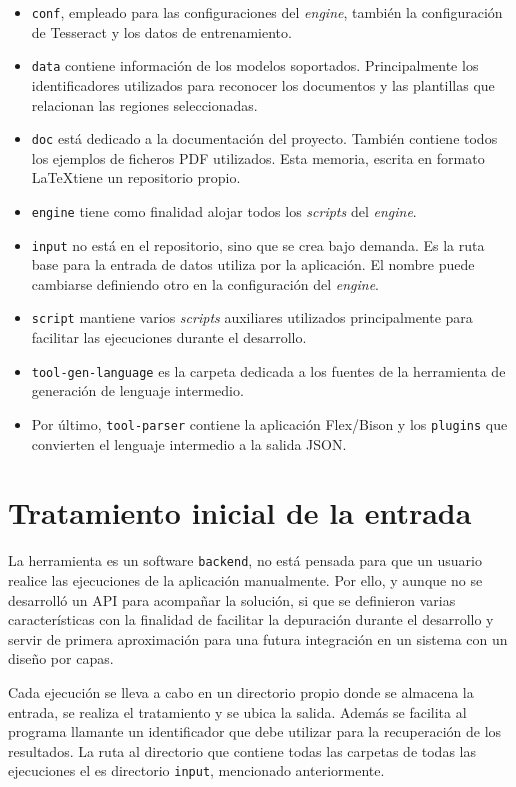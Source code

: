 \begin{itemize}
    \item \verb|conf|, empleado para las configuraciones del \emph{engine}, también la configuración de Tesseract y los datos de entrenamiento.
    \item \verb|data| contiene información de los modelos soportados. Principalmente los identificadores utilizados para reconocer los documentos y las plantillas que relacionan las regiones seleccionadas.
    \item \verb|doc| está dedicado a la documentación del proyecto. También contiene todos los ejemplos de ficheros PDF utilizados. Esta memoria, escrita en formato \LaTeX  tiene un repositorio propio.
    \item \verb|engine| tiene como finalidad alojar todos los \emph{scripts} del \emph{engine}.
    \item \verb|input| no está en el repositorio, sino que se crea bajo demanda. Es la ruta base para la entrada de datos utiliza por la aplicación. El nombre puede cambiarse definiendo otro en la configuración del \emph{engine}.
    \item \verb|script| mantiene varios \emph{scripts} auxiliares utilizados principalmente para facilitar las ejecuciones durante el desarrollo.
    \item \verb|tool-gen-language| es la carpeta dedicada a los fuentes de la herramienta de generación de lenguaje intermedio.
    \item Por último, \verb|tool-parser| contiene la aplicación Flex/Bison y los \verb|plugins| que convierten el lenguaje intermedio a la salida JSON.
\end{itemize}

\section{Tratamiento inicial de la entrada}

La herramienta es un software \verb|backend|, no está pensada para que un usuario realice las ejecuciones de la aplicación manualmente. Por ello, y aunque no se desarrolló un API para acompañar la solución, si que se definieron varias características con la finalidad de facilitar la depuración durante el desarrollo y servir de primera aproximación para una futura integración en un sistema con un diseño por capas.

Cada ejecución se lleva a cabo en un directorio propio donde se almacena la entrada, se realiza el tratamiento y se ubica la salida. Además se facilita al programa llamante un identificador que debe utilizar para la recuperación de los resultados. La ruta al directorio que contiene todas las carpetas de todas las ejecuciones el es directorio \verb|input|, mencionado anteriormente.

